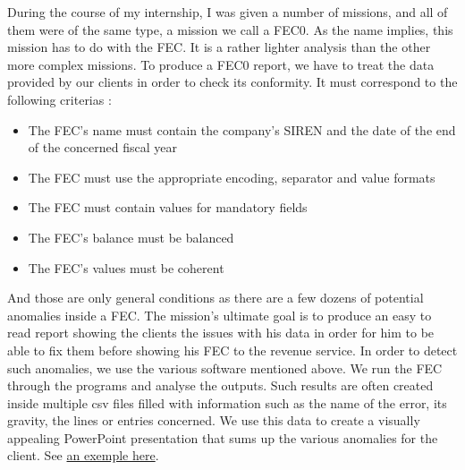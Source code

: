 \documentclass[12pt]{article}
\begin{document}
During the course of my internship, I was given a number of missions, and all of them were of the same type, a mission we call a FEC0. As the name implies, this mission has to do with the FEC. It is a rather lighter analysis than the other more complex missions. To produce a FEC0 report, we have to treat the data provided by our clients in order to check its conformity. It must correspond to the following criterias : 
\begin{itemize}
    \item The FEC's name must contain the company's SIREN and the date of the end of the concerned fiscal year
    \item The FEC must use the appropriate encoding, separator and value formats
    \item The FEC must contain values for mandatory fields
    \item The FEC's balance must be balanced
    \item The FEC's values must be coherent
\end{itemize}
And those are only general conditions as there are a few dozens of potential anomalies inside a FEC. The mission's ultimate goal is to produce an easy to read report showing the clients the issues with his data in order for him to be able to fix them before showing his FEC to the revenue service. In order to detect such anomalies, we use the various software mentioned above. We run the FEC through the programs and analyse the outputs. Such results are often created inside multiple csv files filled with information such as the name of the error, its gravity, the lines or entries concerned. We use this data to create a visually appealing PowerPoint presentation that sums up the various anomalies for the client. See \hyperref[rapport]{an exemple here}. \\ \\
\end{document}
